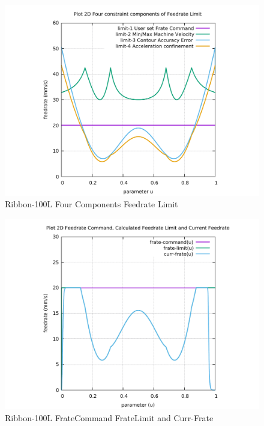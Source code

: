 \begin{figure}
	\caption     {Ribbon-100L Four Components Feedrate Limit}
	\label{10-img-Ribbon-100L-Four-Components-Feedrate-Limit.pdf}
\includegraphics[width=1.00\textwidth]{Chap4/appendix/app-Ribbon-100L/plots/10-img-Ribbon-100L-Four-Components-Feedrate-Limit.pdf}
\end{figure}

\clearpage
\pagebreak

\begin{figure}
	\caption     {Ribbon-100L FrateCommand FrateLimit and Curr-Frate}
	\label{11-img-Ribbon-100L-FrateCommand-FrateLimit-and-Curr-Frate.pdf}
\includegraphics[width=1.00\textwidth]{Chap4/appendix/app-Ribbon-100L/plots/11-img-Ribbon-100L-FrateCommand-FrateLimit-and-Curr-Frate.pdf}
\end{figure}

